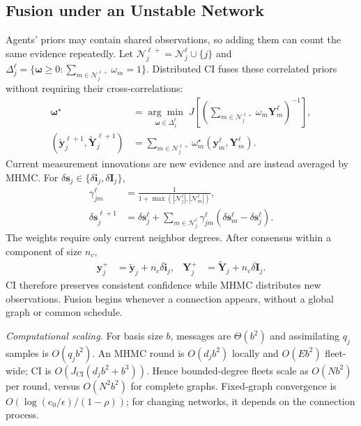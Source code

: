 \documentclass[letterpaper,10pt,conference]{ieeeconf}
\begin{document}
\subsection{Fusion under an Unstable Network}

Agents' priors may contain shared observations, so adding them can count the
same evidence repeatedly. Let
$\mathcal N_j^{\ell+}=\mathcal N_j^\ell\cup\{j\}$ and
$\Delta_j^\ell=\{\bm\omega\geq0:\sum_{m\in\mathcal N_j^{\ell+}}\omega_m=1\}$.
Distributed CI fuses
these correlated priors without requiring their cross-correlations:
\begin{align}
    \bm\omega^\star
    &=\underset{\bm\omega\in\Delta_j^\ell}{\arg\min}\;
      J\!\left[\left(\sum_{m\in\mathcal N_j^{\ell+}}
      \omega_m\bm Y_m^\ell\right)^{-1}\right],
    \label{eq:ci-weights}\\
    (\widetilde{\bm y}_j^{\ell+1},\widetilde{\bm Y}_j^{\ell+1})
    &=\sum_{m\in\mathcal N_j^{\ell+}}\omega_m^\star
      (\bm y_m^\ell,\bm Y_m^\ell).
    \label{eq:ci-update}
\end{align}
Current measurement innovations are new evidence and are instead averaged by
MHMC. For $\delta\bm s_j\in\{\delta\bm i_j,\delta\bm I_j\}$,
\begin{align}
    \gamma_{jm}^\ell
    &=\frac{1}{1+\max(|\mathcal N_j^\ell|,|\mathcal N_m^\ell|)},
    \label{eq:mhmc-weights}\\
    \delta\bm s_j^{\ell+1}
    &=\delta\bm s_j^\ell+\sum_{m\in\mathcal N_j^\ell}
      \gamma_{jm}^\ell(\delta\bm s_m^\ell-\delta\bm s_j^\ell).
    \label{eq:mhmc-update}
\end{align}
The weights require only current neighbor degrees. After consensus within a
component of size $n_c$,
\begin{align}
    \bm{y}_j^{+}
    &=\widetilde{\bm{y}}_j+n_c\overline{\delta\bm{i}}_j,
    &
    \bm{Y}_j^{+}
    &=\widetilde{\bm{Y}}_j+n_c\overline{\delta\bm{I}}_j.
    \label{eq:hybrid-update}
\end{align}
CI therefore preserves consistent confidence while MHMC distributes new
observations. Fusion begins whenever a connection appears, without a global graph or
common schedule.

\noindent\textit{Computational scaling.}
For basis size $b$, messages are $\Theta(b^2)$ and assimilating $q_j$ samples
is $O(q_jb^2)$. An MHMC round is $O(d_jb^2)$ locally and $O(Eb^2)$ fleet-wide;
CI is $O(J_{\mathrm{CI}}(d_jb^2+b^3))$. Hence bounded-degree fleets scale as
$O(Nb^2)$ per round, versus $O(N^2b^2)$ for complete graphs. Fixed-graph
convergence is $O(\log(e_0/\epsilon)/(1-\rho))$; for changing networks, it depends
on the connection process.
\end{document}
